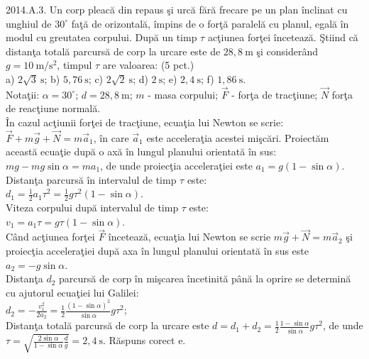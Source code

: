 2014.A.3. Un corp pleacă din repaus şi urcă fără frecare pe un plan înclinat cu unghiul de $30^{\circ}$ faţă de orizontală, împins de o forţă paralelă cu planul, egală în modul cu greutatea corpului. După un timp $\tau$ acţiunea forţei încetează. Ştiind că distanţa totală parcursă de corp la urcare este de $28,8 \mathrm{~m}$ şi considerând $g=10 \mathrm{~m} / \mathrm{s}^{2}$, timpul $\tau$ are valoarea: (5 pct.)\\ a) $2 \sqrt{3} \mathrm{~s}$; b) $5,76 \mathrm{~s}$; c) $2 \sqrt{2} \mathrm{~s}$; d) $2 \mathrm{~s}$; e) $2,4 \mathrm{~s}$; f) $1,86 \mathrm{~s}$.\\ Notaţii: $\alpha=30^{\circ}$; $d=28,8 \mathrm{~m}$; $m$ - masa corpului; $\vec{F}$ - forţa de tracţiune; $\vec{N}$ forţa de reacţiune normală.\\ În cazul acţiunii forţei de tracţiune, ecuaţia lui Newton se scrie:\\ $\vec{F}+m \vec{g}+\vec{N}=m \vec{a}_{1}$, în care $\vec{a}_{1}$ este acceleraţia acestei mişcări. Proiectăm această ecuaţie după o axă în lungul planului orientată în sus:\\ $m g-m g \sin \alpha=m a_{1}$, de unde proiecţia acceleraţiei este $a_{1}=g(1-\sin \alpha)$.\\ Distanţa parcursă în intervalul de timp $\tau$ este:\\ $d_{1}=\frac{1}{2} a_{1} \tau^{2}=\frac{1}{2} g \tau^{2}(1-\sin \alpha)$.\\ Viteza corpului după intervalul de timp $\tau$ este:\\ $v_{1}=a_{1} \tau=g \tau(1-\sin \alpha)$.\\ Când acţiunea forţei $\vec{F}$ încetează, ecuaţia lui Newton se scrie $m \vec{g}+\vec{N}=m \vec{a}_{2}$ şi proiecţia acceleraţiei după axa în lungul planului orientată în sus este $a_{2}=-g \sin \alpha$.\\ Distanţa $d_{2}$ parcursă de corp în mişcarea încetinită până la oprire se determină cu ajutorul ecuaţiei lui Galilei:\\ $d_{2}=-\frac{v_{1}^{2}}{2 a_{2}}=\frac{1}{2} \frac{(1-\sin \alpha)^{2}}{\sin \alpha} g \tau^{2}$;\\ Distanţa totală parcursă de corp la urcare este $d=d_{1}+d_{2}=\frac{1}{2} \frac{1-\sin \alpha}{\sin \alpha} g \tau^{2}$, de unde $\tau=\sqrt{\frac{2 \sin \alpha}{1-\sin \alpha} \frac{d}{g}}=2,4 \mathrm{~s}$. Răspuns corect e.\\

